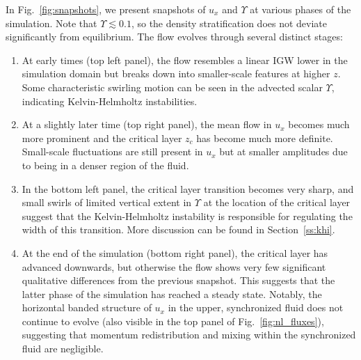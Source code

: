 \documentclass[
        fleqn,
        usenatbib,
    ]{mnras}
\begin{document}
In Fig.~\ref{fig:snapshots}, we present snapshots of $u_x$ and $\Upsilon$ at
various phases of the simulation. Note that $\Upsilon \lesssim
0.1$, so the density stratification does not deviate significantly from
equilibrium. The flow evolves through several distinct stages:
\begin{enumerate}
    \item At early times (top left panel), the flow resembles a linear IGW lower
        in the simulation domain but breaks down into smaller-scale features at
        higher $z$. Some characteristic swirling motion can be seen in the
        advected scalar $\Upsilon$, indicating Kelvin-Helmholtz instabilities.

    \item At a slightly later time (top right panel), the mean flow in
        $u_x$ becomes much more prominent and the critical layer $z_c$ has
        become much more definite. Small-scale fluctuations are still present in
        $u_x$ but at smaller amplitudes due to being in a denser region of the
        fluid.

    \item In the bottom left panel, the critical layer transition becomes very
        sharp, and small swirls of limited vertical extent in $\Upsilon$ at the
        location of the critical layer suggest that the Kelvin-Helmholtz
        instability is responsible for regulating the width of this transition.
        More discussion can be found in Section~\ref{ss:khi}.

    \item At the end of the simulation (bottom right panel), the
        critical layer has advanced downwards, but otherwise
        the flow shows very few significant qualitative differences from the
        previous snapshot. This suggests that the latter phase of the simulation
        has reached a steady state. Notably, the horizontal
        banded structure of $u_x$ in the upper, synchronized fluid does not
        continue to evolve (also visible in the top panel of
        Fig.~\ref{fig:nl_fluxes}), suggesting that momentum redistribution and
        mixing within the synchronized fluid are negligible.
\end{enumerate}
\end{document}
